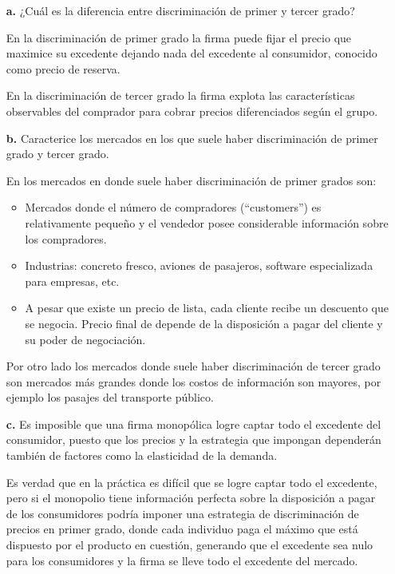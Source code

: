 \documentclass{exam}
\begin{document}
\begin{itemize}
    \item[\textbf{a.}] ¿Cuál es la diferencia entre discriminación de primer y tercer grado?
    \begin{solution}
        En la discriminación de primer grado la firma puede fijar el precio que maximice su excedente dejando nada del excedente al consumidor, conocido como precio de reserva.

        En la discriminación de tercer grado la firma explota las características observables del comprador para cobrar precios diferenciados según el grupo. 
    \end{solution}
    \item[\textbf{b.}] Caracterice los mercados en los que suele haber discriminación de primer grado y tercer grado. 
    \begin{solution}
        En los mercados en donde suele haber discriminación de primer grados son:
        \begin{itemize}
            \item Mercados donde el número de compradores (“customers”) es relativamente pequeño y el vendedor posee considerable información sobre los compradores.
            \item Industrias: concreto fresco, aviones de pasajeros, software especializada para empresas, etc.
            \item A pesar que existe un precio de lista, cada cliente recibe un descuento que se negocia. Precio final de depende de la disposición a pagar del cliente y su poder de negociación.
        \end{itemize}
        Por otro lado los mercados donde suele haber discriminación de tercer grado son mercados más grandes donde los costos de información son mayores, por ejemplo los pasajes del transporte público. 
    \end{solution}
    \item[\textbf{c.}] Es imposible que una firma monopólica logre captar todo el excedente del consumidor, puesto que los precios y la estrategia que impongan dependerán también de factores como la elasticidad de la demanda.
    \begin{solution}
        Es verdad que en la práctica es difícil que se logre captar todo el excedente, pero si el monopolio tiene información perfecta sobre la disposición a pagar de los consumidores podría imponer una estrategia de discriminación de precios en primer grado, donde cada individuo paga el máximo que está dispuesto por el producto en cuestión, generando que el excedente sea nulo para los consumidores y la firma se lleve todo el excedente del mercado.

\end{solution}
\end{itemize}
\end{document}
